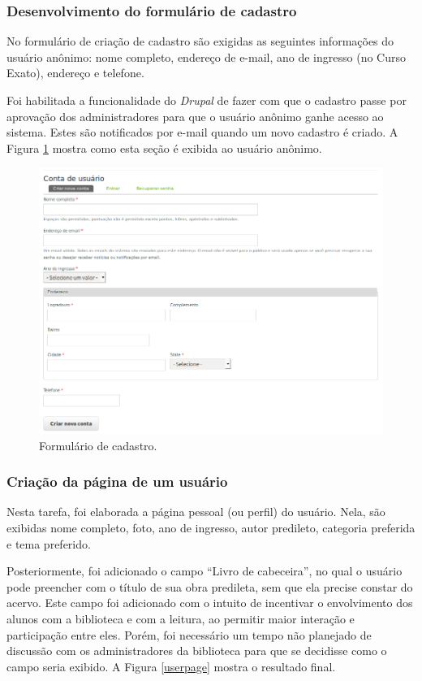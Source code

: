 \documentclass[a4paper]{article}
\begin{document}
\subsubsection{Desenvolvimento do formulário de cadastro}

No formulário de criação de cadastro são exigidas as seguintes informações do usuário anônimo: nome completo, endereço de e-mail, ano de ingresso (no Curso Exato), endereço e telefone.

Foi habilitada a funcionalidade do \textit{Drupal} de fazer com que o cadastro passe por aprovação dos administradores para que o usuário anônimo ganhe acesso ao sistema. Estes são notificados por e-mail quando um novo cadastro é criado. A Figura \ref{cadastro} mostra como esta seção é exibida ao usuário anônimo.

\begin{figure}[pbth!]
\centering
\includegraphics[width=140mm]{img/newuser.png}
\caption{Formulário de cadastro.\label{cadastro}}
\end{figure}

\subsubsection{Criação da página de um usuário}

Nesta tarefa, foi elaborada a página pessoal (ou perfil) do usuário. Nela, são exibidas nome completo, foto, ano de ingresso, autor predileto, categoria preferida e tema preferido.

Posteriormente, foi adicionado o campo “Livro de cabeceira”, no qual o usuário pode preencher com o título de sua obra predileta, sem que ela precise constar do acervo. Este campo foi adicionado com o intuito de incentivar o envolvimento dos alunos com a biblioteca e com a leitura, ao permitir maior interação e participação entre eles. Porém, foi necessário um tempo não planejado de discussão com os administradores da biblioteca para que se decidisse como o campo seria exibido. A Figura \ref{userpage} mostra o resultado final.
\end{document}
